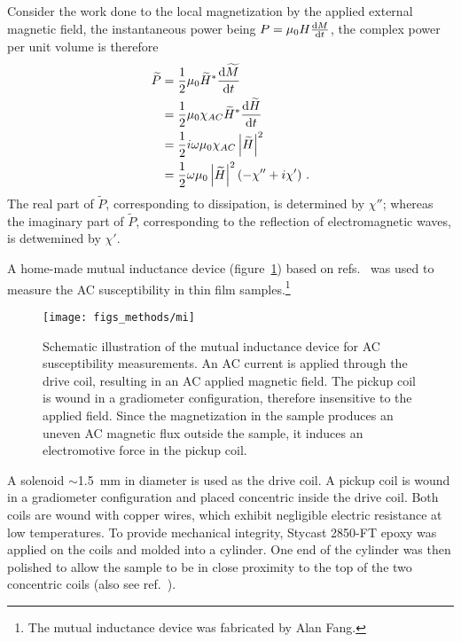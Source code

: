 Consider the work done to the local magnetization by the applied external magnetic field, the instantaneous power being $P = \mu_0H\frac{\mathop{}\!\mathrm{d} M}{\mathop{}\!\mathrm{d} t}$, the complex power per unit volume is therefore%
\begin{align}%
    \widetilde{P} &= \frac{1}{2}\mu_0 \widetilde{H}^* \frac{\diff \widetilde{M}}{\diff t}\nonumber\\
        &= \frac{1}{2}\mu_0\chi_{AC}\widetilde{H}^*\frac{\diff \widetilde{H}}{\diff t}\nonumber\\
        &= \frac{1}{2}i\omega\mu_0\chi_{AC}\left|\widetilde{H}\right|^2\nonumber\\
        &= \frac{1}{2}\omega\mu_0\left|\widetilde{H}\right|^2(-\chi''+i\chi')\label{eq:acm_power}~.
\end{align}%
The real part of $\widetilde{P}$, corresponding to dissipation, is determined by $\chi''$; whereas the imaginary part of $\widetilde{P}$, corresponding to the reflection of electromagnetic waves, is detwemined by $\chi'$.

A home-made mutual inductance device (figure~\ref{fig:mi_sketch}) based on refs.~\cite{Jeanneret1989} was used to measure the AC susceptibility in thin film samples.\footnote{The mutual inductance device was fabricated by Alan Fang.} %
\begin{figure}[ht]%
	\centering%
    \texttt{[image: figs\_methods/mi]}%
    \caption[Mutual inductance device for AC susceptibility measurements]{\label{fig:mi_sketch}Schematic illustration of the mutual inductance device for AC susceptibility measurements. An AC current is applied through the drive coil, resulting in an AC applied magnetic field. The pickup coil is wound in a gradiometer configuration, therefore insensitive to the applied field. Since the magnetization in the sample produces an uneven AC magnetic flux outside the sample, it induces an electromotive force in the pickup coil.}%
\end{figure}%
%
A solenoid $\sim$\SI{1.5}{mm} in diameter is used as the drive coil. A pickup coil is wound in a gradiometer configuration and placed concentric inside the drive coil. Both coils are wound with copper wires, which exhibit negligible electric resistance at low temperatures. To provide mechanical integrity, Stycast 2850-FT epoxy was applied on the coils and molded into a cylinder. One end of the cylinder was then polished to allow the sample to be in close proximity to the top of the two concentric coils (also see ref.~\cite{YazdaniThesis}).

